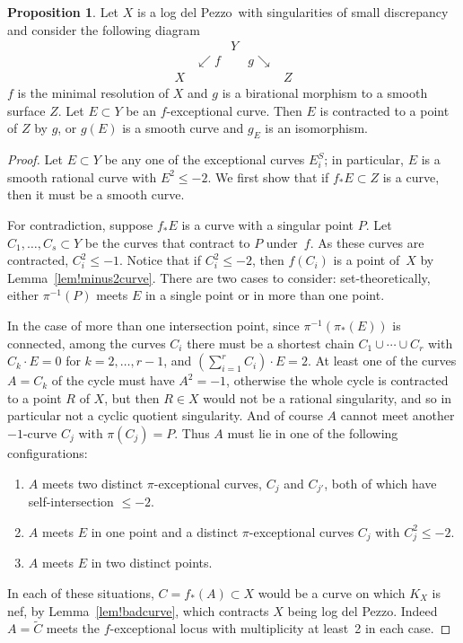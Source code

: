 \documentclass[11pt]{amsbook}
\theoremstyle{definition}
\theoremstyle{definition}
\theoremstyle{definition}
\newtheorem{prop}[thm]{Proposition}
\theoremstyle{definition}
\theoremstyle{definition}
\theoremstyle{definition}
\theoremstyle{definition}
\theoremstyle{definition}
\newcommand{\ldp}{log del Pezzo}
\newcommand{\wt}[1]{\widetilde #1}
\begin{document}
\begin{prop}\label{MainProp}
Let $X$ is a \ldp\ with singularities of small discrepancy and 
consider the following diagram
\[
\begin{array}{ccccc}
&&Y\\
&\swarrow f && g\searrow \\
X&&&&Z
\end{array}
\]
$f$ is the minimal resolution of $X$ and $g$ is a birational
morphism to a smooth surface $Z$.
Let $E\subset Y$ be an $f$-exceptional curve. Then $E$ is contracted to a point
of $Z$ by $g$, or $g(E)$ is a smooth curve and $g_E$ is an isomorphism.
\end{prop}

\begin{proof}
Let $E\subset Y$ be any one of the exceptional curves $E_i^S$; in particular, $E$ is
a smooth rational curve with $E^2 \le-2$.
We first show that if $f_* E\subset Z$ is a curve, then it must be a smooth curve. 

For contradiction, suppose $f_*E$ is a curve with a singular point $P$.
Let $C_1,\dots,C_s\subset Y$ be the curves that contract to $P$ under~$f$.
As these curves are contracted, $C_i^2 \leq  -1$.
Notice that if $C_i^2\le-2$, then $f(C_i)$ is a point of~$X$
by Lemma~\ref{lem!minus2curve}.
There are two cases to consider: set-theoretically, either
$\pi^{-1}(P)$ meets $E$ in a single point or in more than one point.


In the case of more than one intersection point, since $\pi^{-1}(\pi_*(E))$ is connected,
among the curves $C_i$ there must be a shortest chain $C_1\cup\cdots\cup C_r$
with $C_k\cdot E=0$ for $k=2,\dots,r-1$, and $\left(\sum_{i=1}^r C_i\right)\cdot E = 2$.
At least one of the curves $A=C_k$ of the cycle must have $A^2=-1$, otherwise the
whole cycle is contracted to a point $R$ of $X$, but then $R\in X$ would not be
a rational singularity, and so in particular not a cyclic quotient singularity.
And of course $A$ cannot meet another $-1$-curve $C_j$ with $\pi(C_j)=P$.
Thus $A$ must lie in one of the following configurations:
\begin{enumerate}
\item
$A$ meets two distinct $\pi$-exceptional curves, $C_j$ and $C_{j'}$,
both of which have self-intersection $\le-2$.
\item
$A$ meets $E$ in one point and a distinct $\pi$-exceptional curves $C_j$
with $C_j^2\le-2$.
\item
$A$ meets $E$ in two distinct points.
\end{enumerate}
In each of these situations, $C = f_*(A)\subset X$ would be a curve
on which $K_X$ is nef, by Lemma~\ref{lem!badcurve}, which contracts
$X$ being \ldp. Indeed $A = \wt C$ meets the $f$-exceptional locus with multiplicity
at least~2 in each case.


\end{proof}
\end{document}
